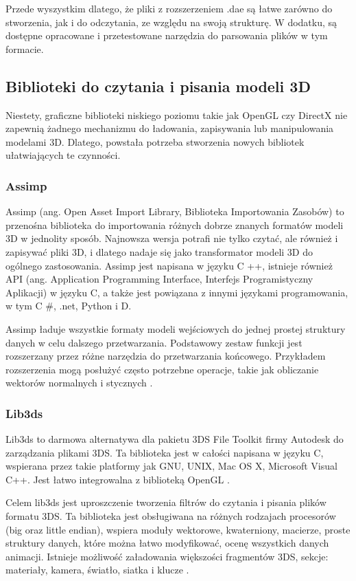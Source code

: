 Przede wyszystkim dlatego, że pliki z rozszerzeniem .dae są łatwe zarówno do stworzenia, jak i do odczytania, ze względu na swoją strukturę. W dodatku, są dostępne opracowane i przetestowane narzędzia do parsowania plików w tym formacie. 


\subsection{Biblioteki do czytania i pisania modeli 3D}
Niestety, graficzne biblioteki niskiego poziomu takie jak OpenGL czy DirectX nie zapewnią żadnego mechanizmu do ładowania, zapisywania lub manipulowania modelami 3D. Dlatego, powstała potrzeba stworzenia nowych bibliotek ułatwiających te czynności. 
\subsubsection{Assimp}
Assimp (ang. Open Asset Import Library, Biblioteka Importowania Zasobów) to przenośna biblioteka do importowania różnych dobrze znanych formatów modeli 3D w jednolity sposób. Najnowsza wersja potrafi nie tylko czytać, ale również i zapisywać pliki 3D, i dlatego nadaje się jako transformator modeli 3D do ogólnego zastosowania. Assimp jest napisana w języku C ++, istnieje również API (ang. Application Programming Interface, Interfejs Programistyczny Aplikacji) w języku C, a także jest powiązana z innymi językami programowania, w tym C \#, .net, Python i D.

Assimp ładuje wszystkie formaty modeli wejściowych do jednej prostej struktury danych w celu dalszego przetwarzania. Podstawowy zestaw funkcji jest rozszerzany przez różne narzędzia do przetwarzania końcowego. Przykładem rozszerzenia mogą posłużyć często potrzebne operacje, takie jak obliczanie wektorów normalnych i stycznych \cite{assimp}.

\subsubsection{Lib3ds}
Lib3ds to darmowa alternatywa dla pakietu 3DS File Toolkit firmy Autodesk do zarządzania plikami 3DS. Ta biblioteka jest w całości napisana w języku C, wspierana przez takie platformy jak GNU, UNIX, Mac OS X, Microsoft Visual C++. Jest łatwo integrowalna z biblioteką OpenGL \cite{lib3dsofficial}. 

Celem lib3ds jest uproszczenie tworzenia filtrów do czytania i pisania plików formatu 3DS. Ta biblioteka jest obsługiwana na różnych rodzajach procesorów (big oraz little endian), wspiera moduły wektorowe, kwaterniony, macierze, proste struktury danych, które można łatwo modyfikować, ocenę wszystkich danych animacji. Istnieje możliwość załadowania większości fragmentów 3DS, sekcje: materiały, kamera, światło, siatka i klucze \cite{lib3dsdirectory}.

